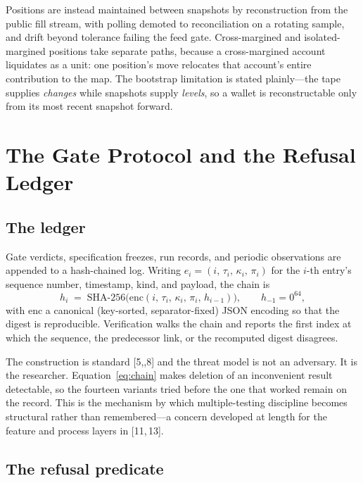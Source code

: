 \documentclass[11pt,a4paper]{article}
\theoremstyle{definition}
\theoremstyle{plain}
\begin{document}
Positions are instead maintained between snapshots by reconstruction from the public fill stream,
with polling demoted to reconciliation on a rotating sample, and drift beyond tolerance failing the
feed gate. Cross-margined and isolated-margined positions take separate paths, because a
cross-margined account liquidates as a unit: one position's move relocates that account's entire
contribution to the map. The bootstrap limitation is stated plainly---the tape supplies
\emph{changes} while snapshots supply \emph{levels}, so a wallet is reconstructable only from its
most recent snapshot forward.

\section{The Gate Protocol and the Refusal Ledger}
\label{sec:gates}

\subsection{The ledger}

Gate verdicts, specification freezes, run records, and periodic observations are appended to a
hash-chained log. Writing $e_i = (i,\, \tau_i,\, \kappa_i,\, \pi_i)$ for the $i$-th entry's sequence
number, timestamp, kind, and payload, the chain is
\begin{equation}
  h_i \;=\; \mathrm{SHA\text{-}256}\bigl( \mathrm{enc}(i,\, \tau_i,\, \kappa_i,\, \pi_i,\, h_{i-1}) \bigr),
  \qquad h_{-1} = 0^{64},
  \label{eq:chain}
\end{equation}
with $\mathrm{enc}$ a canonical (key-sorted, separator-fixed) JSON encoding so that the digest is
reproducible. Verification walks the chain and reports the first index at which the sequence, the
predecessor link, or the recomputed digest disagrees.

The construction is standard [5,,8] and the threat model is not an adversary.
It is the researcher. Equation~\eqref{eq:chain} makes deletion of an inconvenient result detectable,
so the fourteen variants tried before the one that worked remain on the record. This is the
mechanism by which multiple-testing discipline becomes structural rather than remembered---a concern
developed at length for the feature and process layers in [11,\,13].

\subsection{The refusal predicate}
\end{document}
